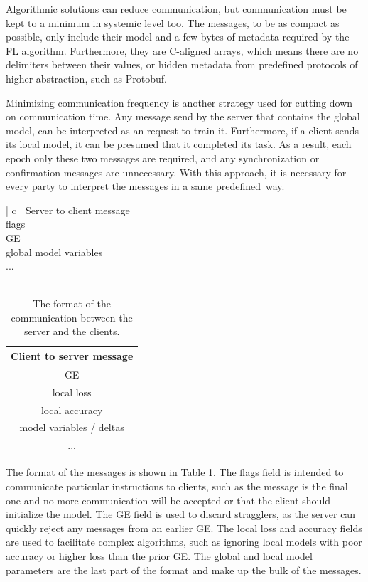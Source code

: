 Algorithmic solutions can reduce communication, but communication must be kept to a minimum in systemic level too. The messages, to be as compact as possible, only include their model and a few bytes of metadata required by the FL algorithm. Furthermore, they are C-aligned arrays, which means there are no delimiters between their values, or hidden metadata from predefined protocols of higher abstraction, such as Protobuf.

Minimizing communication frequency is another strategy used for cutting down on communication time. Any message send by the server that contains the global model, can be interpreted as an request to train it. Furthermore, if a client sends its local model, it can be presumed that it completed its task. As a result, each epoch only these two messages are required, and any synchronization or confirmation messages are unnecessary. With this approach, it is necessary for every party to interpret the messages in a same predefined way.

\begin{table}[H]
    \center
    \begin{tabular}{ | c | }
        \hline
        Server to client message\\
        \hline\hline
        flags\\
        \hline
        GE\\
        \hline
        global model variables\\
        ...\\
        \hline
         \\
    \end{tabular}
    \quad
    \begin{tabular}{ | c | }
        \hline
        Client to server message\\
        \hline\hline
        GE\\
        \hline
        local loss\\
        \hline
        local accuracy\\
        \hline
        model variables / deltas\\
        ...\\
        \hline
    \end{tabular}
    \caption[Communication Scheme]{The format of the communication between the server and the clients.}
    \label{table:FL messages structure}
\end{table}

The format of the messages is shown in Table \ref{table:FL messages structure}. The flags field is intended to communicate particular instructions to clients, such as the message is the final one and no more communication will be accepted or that the client should initialize the model. The GE field is used to discard stragglers, as the server can quickly reject any messages from an earlier GE. The local loss and accuracy fields are used to facilitate complex algorithms, such as ignoring local models with poor accuracy or higher loss than the prior GE. The global and local model parameters are the last part of the format and make up the bulk of the messages.

